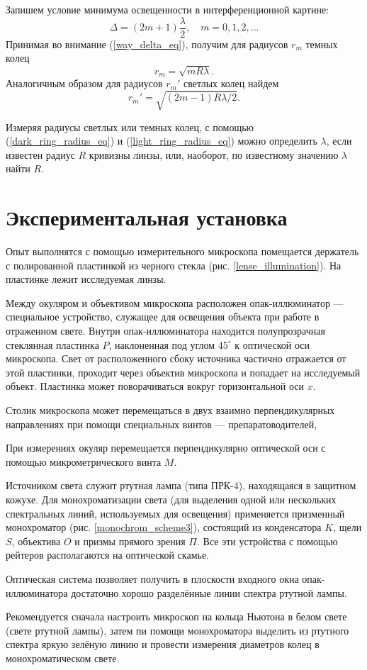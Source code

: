 \documentclass[a4paper, 12pt]{article}
\begin{document}
	Запишем условие минимума освещенности в интерференционной картине:
	\begin{equation}
		\Delta=\left(2m+1\right)\frac{\lambda}{2}, \quad m=0,1,2, ...
	\end{equation}
	Принимая во внимание (\ref{way_delta_eq}), получим для радиусов $r_m$ темных колец
	\begin{equation}
		r_m=\sqrt{mR\lambda}.
		\label{dark_ring_radius_eq}
	\end{equation}
	Аналогичным образом для радиусов $r_m'$ светлых колец найдем
	\begin{equation}
		r_m'=\sqrt{\left(2m-1\right)R\lambda/2}.
		\label{light_ring_radius_eq}
	\end{equation}
	\par
	Измеряя радиусы светлых или темных колец, с помощью (\ref{dark_ring_radius_eq}) и (\ref{light_ring_radius_eq}) можно определить $\lambda$, если известен радиус $R$ кривизны линзы, или, наоборот, по известному значению $\lambda$ найти $R$.
	\section{Экспериментальная установка}
	Опыт выполнятся с помощью измерительного микроскопа помещается держатель с полированной пластинкой из черного стекла (рис. \ref{lense_illumination}). На пластинке лежит исследуемая линзы.\par
	Между окуляром и объективом микроскопа расположен опак-иллюминатор — специальное устройство, служащее для освещения объекта при работе в отраженном свете. Внутри опак-иллюминатора находится полупрозрачная стеклянная пластинка $P$, наклоненная под углом $45^\circ$ к оптической оси микроскопа. Свет от расположенного сбоку источника частично отражается от этой пластинки, проходит через объектив микроскопа и попадает на исследуемый объект. Пластинка может поворачиваться вокруг горизонтальной оси $x$.\par
	Столик микроскопа может перемещаться в двух взаимно перпендикулярных направлениях при помощи специальных винтов — препаратоводителей,\par
	При измерениях окуляр перемещается перпендикулярно оптической оси с помощью микрометрического винта $M$.\par
	Источником света служит ртутная лампа (типа ПРК-4), находящаяся в защитном кожухе. Для монохроматизации света (для выделения одной или нескольких спектральных линий, используемых для освещения) применяется призменный монохроматор (рис. \ref{monochrom_scheme3}), состоящий из конденсатора $K$, щели $S$, объектива $O$ и призмы прямого зрения $\Pi$. Все эти устройства с помощью рейтеров располагаются на оптической скамье.\par
	Оптическая система позволяет получить в плоскости входного окна опак-иллюминатора достаточно хорошо разделённые линии спектра ртутной лампы.\par
	Рекомендуется сначала настроить микроскоп на кольца Ньютона в белом свете (свете ртутной лампы), затем пи помощи монохроматора выделить из ртутного спектра яркую зелёную линию и провести измерения диаметров колец в монохроматическом свете.
\end{document}
